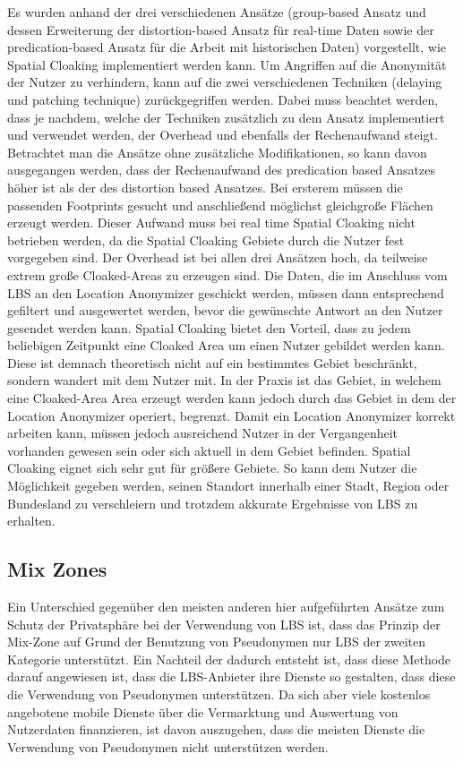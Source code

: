 Es wurden anhand der drei verschiedenen Ansätze (group-based Ansatz und dessen Erweiterung der distortion-based Ansatz für real-time Daten sowie der predication-based Ansatz für die Arbeit mit historischen Daten) vorgestellt, wie Spatial Cloaking implementiert werden kann. Um Angriffen auf die Anonymität der Nutzer zu verhindern, kann auf die zwei verschiedenen Techniken (delaying und patching technique) zurückgegriffen werden. Dabei muss beachtet werden, dass je nachdem, welche der Techniken zusätzlich zu dem Ansatz implementiert und verwendet werden, der Overhead und ebenfalls der Rechenaufwand steigt. Betrachtet man die Ansätze ohne zusätzliche Modifikationen, so kann davon ausgegangen werden, dass der Rechenaufwand des predication based Ansatzes höher ist als der des distortion based Ansatzes. Bei ersterem müssen die passenden Footprints gesucht und anschließend möglichst gleichgroße Flächen erzeugt werden. Dieser Aufwand muss bei real time Spatial Cloaking nicht betrieben werden, da die Spatial Cloaking Gebiete durch die Nutzer fest vorgegeben sind. Der Overhead ist bei allen drei Ansätzen hoch, da teilweise extrem große Cloaked-Areas zu erzeugen sind. Die Daten, die im Anschluss vom LBS an den Location Anonymizer geschickt werden, müssen dann entsprechend gefiltert und ausgewertet werden, bevor die gewünschte Antwort an den Nutzer gesendet werden kann. Spatial Cloaking bietet den Vorteil, dass zu jedem beliebigen Zeitpunkt eine Cloaked Area um einen Nutzer gebildet werden kann. Diese ist demnach theoretisch nicht auf ein bestimmtes Gebiet beschränkt, sondern wandert mit dem Nutzer mit. In der Praxis ist das Gebiet, in welchem eine Cloaked-Area Area erzeugt werden kann jedoch durch das Gebiet in dem der Location Anonymizer operiert, begrenzt. Damit ein Location Anonymizer korrekt arbeiten kann, müssen jedoch ausreichend Nutzer in der Vergangenheit vorhanden gewesen sein oder sich aktuell in dem Gebiet befinden. Spatial Cloaking eignet sich sehr gut für größere Gebiete. So kann dem Nutzer die Möglichkeit gegeben werden, seinen Standort innerhalb einer Stadt, Region oder Bundesland zu verschleiern und trotzdem akkurate Ergebnisse von LBS zu erhalten.
\subsection{Mix Zones}
Ein Unterschied gegenüber den  meisten anderen hier aufgeführten Ansätze zum Schutz der Privatsphäre bei der Verwendung von LBS ist, dass das Prinzip der Mix-Zone auf Grund der Benutzung von Pseudonymen nur LBS der zweiten Kategorie unterstützt. Ein Nachteil der dadurch entsteht ist, dass diese Methode darauf angewiesen ist, dass die LBS-Anbieter ihre Dienste so gestalten, dass diese die Verwendung von Pseudonymen unterstützen. Da sich aber viele kostenlos angebotene mobile Dienste über die Vermarktung und Auswertung von Nutzerdaten finanzieren, ist davon auszugehen, dass die meisten Dienste die Verwendung von Pseudonymen nicht unterstützen werden.


